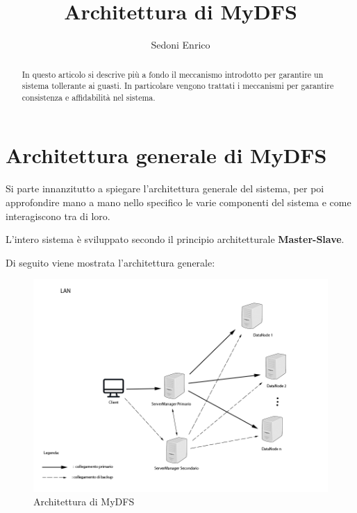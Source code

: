 \documentclass[]{article}
\title{Architettura di MyDFS}
\author{Sedoni Enrico}
\begin{document}
\maketitle

\begin{abstract}

In questo articolo si descrive più a fondo il meccanismo introdotto per garantire un sistema tollerante ai guasti. In particolare vengono trattati i meccanismi per garantire consistenza e affidabilità nel sistema.

\end{abstract}


\tableofcontents
\newpage

\section{Architettura generale di MyDFS}

Si parte innanzitutto a spiegare l'architettura generale del sistema, per poi approfondire mano a mano nello specifico le varie componenti del sistema e come interagiscono tra di loro.

\setlength\parindent{0pt}
L'intero sistema è sviluppato secondo il principio architetturale \textbf{Master-Slave}.

\vspace{1.5cm}
\setlength\parindent{0pt}
Di seguito viene mostrata l'architettura generale:

\begin{figure}[h]
	\centering
	\includegraphics[width=16cm]{../Img/ArchitetturaMyDFS}
	\caption[]{Architettura di MyDFS}
	\label{fig:ArchitetturaMyDFS}
	
\end{figure}
\end{document}
